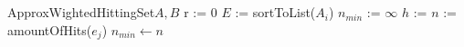\documentclass[a4paper]{article}
\begin{document}
	\maketitle
	\section{}
		\begin{pseudocode}{ApproxWightedHittingSet}{$A, B$}
			\State r := 0
				\State $E$ := sortToList($A_i$)
				\State $n_{min}$ := $\infty$
				\State $h$ := \Null
					\State $n$ := amountOfHits($e_j$)
						\State $n_{min} \leftarrow n$
					\EndIf
				\EndFor
			\EndFor
		\end{pseudocode}
	\section{}
\end{document}
